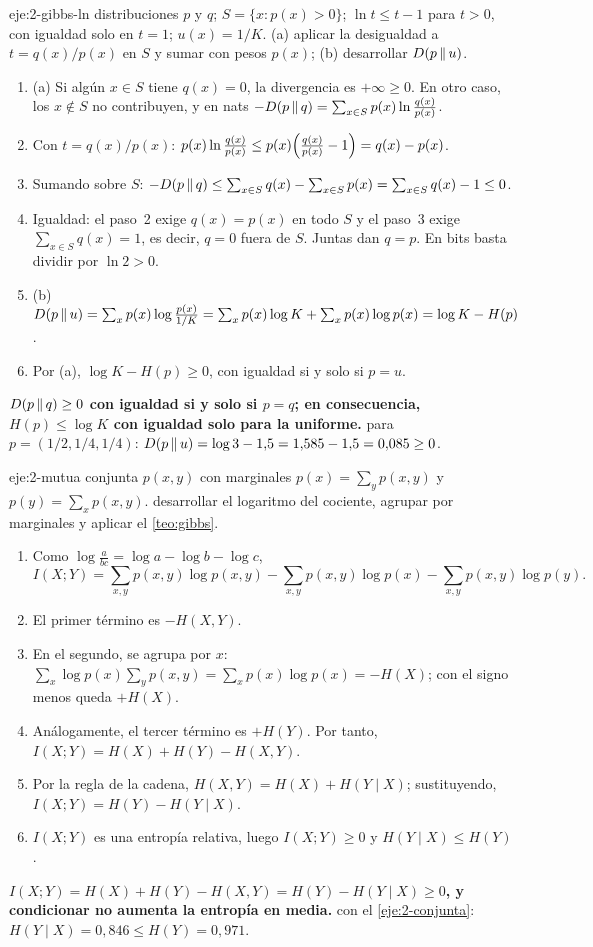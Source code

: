 \begin{solucion}{eje:2-gibbs-ln}
\datos distribuciones $p$ y $q$; $S=\{x:p(x)>0\}$; $\ln t\le t-1$ para $t>0$, con igualdad solo en $t=1$; $u(x)=1/K$.
\planteamiento (a) aplicar la desigualdad a $t=q(x)/p(x)$ en $S$ y sumar con pesos $p(x)$; (b) desarrollar $D(p\,\|\,u)$.
\pasos
\begin{enumerate}[label=\arabic*.]
  \item (a) Si algún $x\in S$ tiene $q(x)=0$, la divergencia es $+\infty\ge 0$. En otro caso, los $x\notin S$ no contribuyen, y en nats $-D(p\,\|\,q)=\sum_{x\in S}p(x)\ln\frac{q(x)}{p(x)}$.
  \item Con $t=q(x)/p(x)$: $p(x)\ln\frac{q(x)}{p(x)}\le p(x)\Bigl(\frac{q(x)}{p(x)}-1\Bigr)=q(x)-p(x)$.
  \item Sumando sobre $S$: $-D(p\,\|\,q)\le\sum_{x\in S}q(x)-\sum_{x\in S}p(x)=\sum_{x\in S}q(x)-1\le 0$.
  \item Igualdad: el paso~2 exige $q(x)=p(x)$ en todo $S$ y el paso~3 exige $\sum_{x\in S}q(x)=1$, es decir, $q=0$ fuera de $S$. Juntas dan $q=p$. En bits basta dividir por $\ln 2>0$.
  \item (b) $D(p\,\|\,u)=\sum_xp(x)\log\frac{p(x)}{1/K}=\sum_xp(x)\log K+\sum_xp(x)\log p(x)=\log K-H(p)$.
  \item Por (a), $\log K-H(p)\ge 0$, con igualdad si y solo si $p=u$.
\end{enumerate}
\resultado \textbf{$D(p\,\|\,q)\ge 0$ con igualdad si y solo si $p=q$; en consecuencia, $H(p)\le\log K$ con igualdad solo para la uniforme.}
\comprobacion para $p=(1/2,1/4,1/4)$: $D(p\,\|\,u)=\log 3-1{,}5=1{,}585-1{,}5=0{,}085\ge 0$.
\end{solucion}

\begin{solucion}{eje:2-mutua}
\datos conjunta $p(x,y)$ con marginales $p(x)=\sum_yp(x,y)$ y $p(y)=\sum_xp(x,y)$.
\planteamiento desarrollar el logaritmo del cociente, agrupar por marginales y aplicar el \cref{teo:gibbs}.
\pasos
\begin{enumerate}[label=\arabic*.]
  \item Como $\log\frac{a}{bc}=\log a-\log b-\log c$,
  \[I(X;Y)=\sum_{x,y}p(x,y)\log p(x,y)-\sum_{x,y}p(x,y)\log p(x)-\sum_{x,y}p(x,y)\log p(y).\]
  \item El primer término es $-H(X,Y)$.
  \item En el segundo, se agrupa por $x$: $\sum_x\log p(x)\sum_yp(x,y)=\sum_xp(x)\log p(x)=-H(X)$; con el signo menos queda $+H(X)$.
  \item Análogamente, el tercer término es $+H(Y)$. Por tanto, $I(X;Y)=H(X)+H(Y)-H(X,Y)$.
  \item Por la regla de la cadena, $H(X,Y)=H(X)+H(Y\mid X)$; sustituyendo, $I(X;Y)=H(Y)-H(Y\mid X)$.
  \item $I(X;Y)$ es una entropía relativa, luego $I(X;Y)\ge 0$ y $H(Y\mid X)\le H(Y)$.
\end{enumerate}
\resultado \textbf{$I(X;Y)=H(X)+H(Y)-H(X,Y)=H(Y)-H(Y\mid X)\ge 0$, y condicionar no aumenta la entropía en media.}
\comprobacion con el \cref{eje:2-conjunta}: $H(Y\mid X)=0{,}846\le H(Y)=0{,}971$.
\end{solucion}

